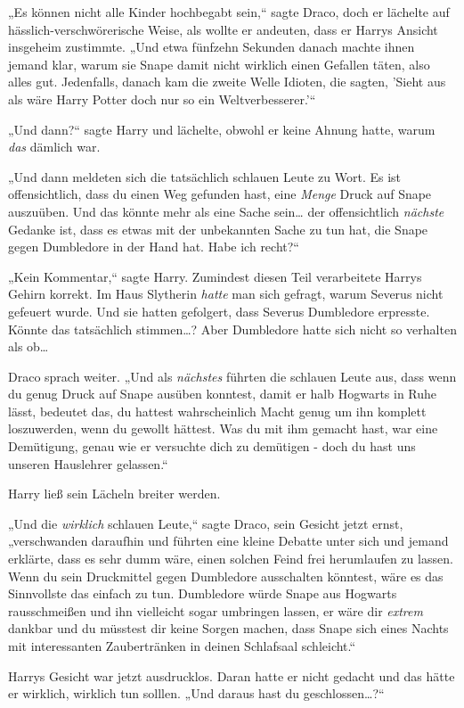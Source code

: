 {„Es können nicht alle Kinder hochbegabt sein,“ sagte Draco, doch er lächelte auf hässlich-verschwörerische Weise, als wollte er andeuten, dass er Harrys Ansicht insgeheim zustimmte. „Und etwa fünfzehn Sekunden danach machte ihnen jemand klar, warum sie Snape damit nicht wirklich einen Gefallen täten, also alles gut. Jedenfalls, danach kam die zweite Welle Idioten, die sagten, 'Sieht aus als wäre Harry Potter doch nur so ein Weltverbesserer.'“

„Und dann?“ sagte Harry und lächelte, obwohl er keine Ahnung hatte, warum \emph{das} dämlich war.

„Und dann meldeten sich die tatsächlich schlauen Leute zu Wort. Es ist offensichtlich, dass du einen Weg gefunden hast, eine \emph{Menge} Druck auf Snape auszuüben. Und das könnte mehr als eine Sache sein… der offensichtlich \emph{nächste} Gedanke ist, dass es etwas mit der unbekannten Sache zu tun hat, die Snape gegen Dumbledore in der Hand hat. Habe ich recht?“

„Kein Kommentar,“ sagte Harry. Zumindest diesen Teil verarbeitete Harrys Gehirn korrekt. Im Haus Slytherin \emph{hatte} man sich gefragt, warum Severus nicht gefeuert wurde. Und sie hatten gefolgert, dass Severus Dumbledore erpresste. Könnte das tatsächlich stimmen…? Aber Dumbledore hatte sich nicht so verhalten als ob…

Draco sprach weiter. „Und als \emph{nächstes} führten die schlauen Leute aus, dass wenn du genug Druck auf Snape ausüben konntest, damit er halb Hogwarts in Ruhe lässt, bedeutet das, du hattest wahrscheinlich Macht genug um ihn komplett loszuwerden, wenn du gewollt hättest. Was du mit ihm gemacht hast, war eine Demütigung, genau wie er versuchte dich zu demütigen - doch du hast uns unseren Hauslehrer gelassen.“

Harry ließ sein Lächeln breiter werden.

„Und die \emph{wirklich} schlauen Leute,“ sagte Draco, sein Gesicht jetzt ernst, „verschwanden daraufhin und führten eine kleine Debatte unter sich und jemand erklärte, dass es sehr dumm wäre, einen solchen Feind frei herumlaufen zu lassen. Wenn du sein Druckmittel gegen Dumbledore ausschalten könntest, wäre es das Sinnvollste das einfach zu tun. Dumbledore würde Snape aus Hogwarts rausschmeißen und ihn vielleicht sogar umbringen lassen, er wäre dir \emph{extrem} dankbar und du müsstest dir keine Sorgen machen, dass Snape sich eines Nachts mit interessanten Zaubertränken in deinen Schlafsaal schleicht.“

Harrys Gesicht war jetzt ausdrucklos. Daran hatte er nicht gedacht und das hätte er wirklich, wirklich tun solllen. „Und daraus hast du geschlossen…?“

}
